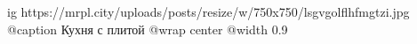  
 
 
 
 

\ifcmt
  ig https://mrpl.city/uploads/posts/resize/w/750x750/lsgvgolflhfmgtzi.jpg
	@caption Кухня с плитой
  @wrap center
  @width 0.9
\fi
